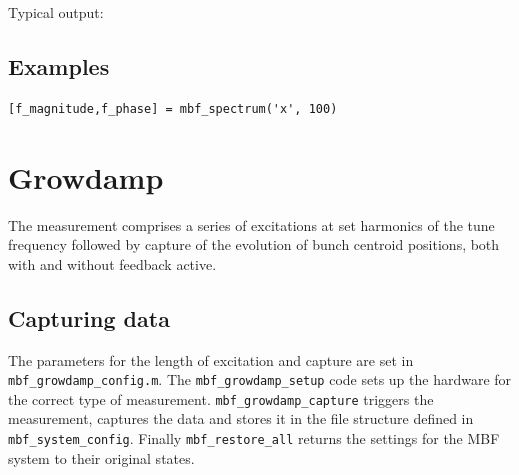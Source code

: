 \documentclass{report}
\begin{document}
Typical output:


\section{Examples}

\begin{verbatim}
[f_magnitude,f_phase] = mbf_spectrum('x', 100)
\end{verbatim}

\chapter{Growdamp}
The measurement comprises a series of excitations at set harmonics of the tune frequency followed by capture of the evolution of bunch centroid positions, both with and without feedback active.
\section{Capturing data}
The parameters for the length of excitation and  capture are set in \verb|mbf_growdamp_config.m|. The \verb|mbf_growdamp_setup| code sets up the hardware for the correct type of measurement. \verb|mbf_growdamp_capture| triggers the measurement, captures the data and stores it in the file structure defined in \verb|mbf_system_config|. Finally \verb|mbf_restore_all| returns the settings for the MBF system to their original states.
\end{document}
